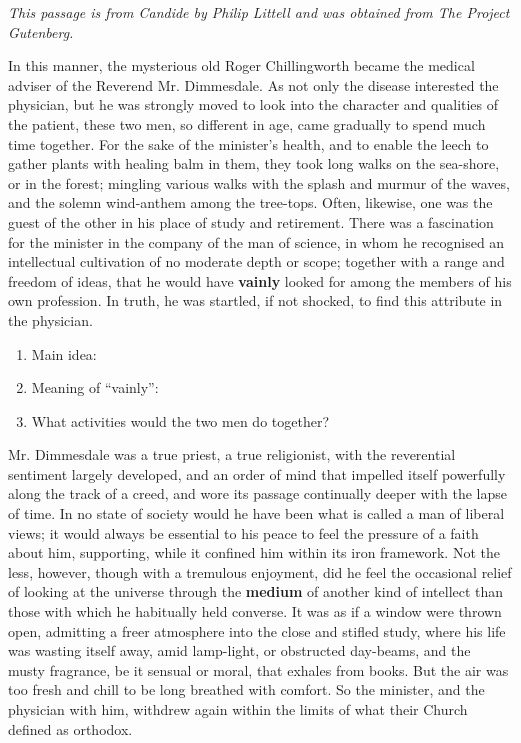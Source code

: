 \textit{This passage is from Candide by  Philip Littell and was obtained from The Project Gutenberg.}

\hrulefill

\bigskip
\begin{linenumbers*}
\modulolinenumbers[5]
\indent In this manner, the mysterious old Roger Chillingworth became the medical adviser of the Reverend Mr. Dimmesdale. As not only the disease interested the physician, but he was strongly moved to look into the character and qualities of the patient, these two men, so different in age, came gradually to spend much time together. For the sake of the minister's health, and to enable the leech to gather plants with healing balm in them, they took long walks on the sea-shore, or in the forest; mingling various walks with the splash and murmur of the waves, and the solemn wind-anthem among the tree-tops. Often, likewise, one was the guest of the other in his place of study and retirement. There was a fascination for the minister in the company of the man of science, in whom he recognised an intellectual cultivation of no moderate depth or scope; together with a range and freedom of ideas, that he would have \textbf{vainly} looked for among the members of his own profession. In truth, he was startled, if not shocked, to find this attribute in the physician.
\end{linenumbers*}

\begin{enumerate}
\item Main idea: \hrulefill
\item Meaning of ``vainly'': \hrulefill
\item What activities would the two men do together? \hrulefill
\end{enumerate}

\begin{linenumbers}
\modulolinenumbers[5]
\indent Mr. Dimmesdale was a true priest, a true religionist, with the reverential sentiment largely developed, and an order of mind that impelled itself powerfully along the track of a creed, and wore its passage continually deeper with the lapse of time. In no state of society would he have been what is called a man of liberal views; it would always be essential to his peace to feel the pressure of a faith about him, supporting, while it confined him within its iron framework. Not the less, however, though with a tremulous enjoyment, did he feel the occasional relief of looking at the universe through the \textbf{medium} of another kind of intellect than those with which he habitually held converse. It was as if a window were thrown open, admitting a freer atmosphere into the close and stifled study, where his life was wasting itself away, amid lamp-light, or obstructed day-beams, and the musty fragrance, be it sensual or moral, that exhales from books. But the air was too fresh and chill to be long breathed with comfort. So the minister, and the physician with him, withdrew again within the limits of what their Church defined as orthodox.
\end{linenumbers}


